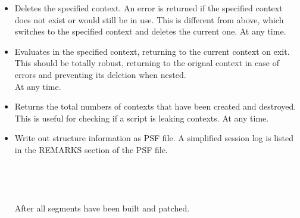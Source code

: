 \begin{itemize}
\item {}
{Deletes the specified context.  An error is returned if the
specified context does not exist or would still be in use.
This is different from  above,
which switches to the specified context and deletes the current one.}
{}
{At any time.}

\item {}
{Evaluates  in the specified context, returning to the current
context on exit.  This should be totally robust, returning to the orignal
context in case of errors and preventing its deletion when nested.}
{\\
}
{At any time.}

\item {}
{Returns the total numbers of contexts that have been created and destroyed.
This is useful for checking if a script is leaking contexts.}
{}
{At any time.}

\item {}
{Write out structure information as PSF file. A simplified session log is listed in the REMARKS 
section of the PSF file.}
{ \\
\\
\\
\\
\\
}
{After all segments have been built and patched.}


\end{itemize}
